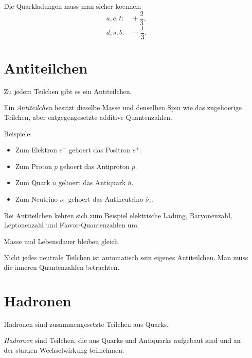 \begin{examtipbox}
Die Quarkladungen muss man sicher koennen:
\[
    u,c,t:\quad +\frac{2}{3},
\]
\[
    d,s,b:\quad -\frac{1}{3}.
\]
\end{examtipbox}

\section{Antiteilchen}

Zu jedem Teilchen gibt es ein Antiteilchen.

\begin{definitionbox}
Ein \emph{Antiteilchen} besitzt dieselbe Masse und denselben Spin wie das zugehoerige
Teilchen, aber entgegengesetzte additive Quantenzahlen.
\end{definitionbox}

\begin{conceptbox}
Beispiele:
\begin{itemize}
    \item Zum Elektron $e^-$ gehoert das Positron $e^+$.
    \item Zum Proton $p$ gehoert das Antiproton $\overline{p}$.
    \item Zum Quark $u$ gehoert das Antiquark $\overline{u}$.
    \item Zum Neutrino $\nu_e$ gehoert das Antineutrino $\overline{\nu}_e$.
\end{itemize}
\end{conceptbox}

\begin{notebox}
Bei Antiteilchen kehren sich zum Beispiel elektrische Ladung, Baryonenzahl,
Leptonenzahl und Flavor-Quantenzahlen um.

Masse und Lebensdauer bleiben gleich.
\end{notebox}

\begin{examtipbox}
Nicht jedes neutrale Teilchen ist automatisch sein eigenes Antiteilchen.
Man muss die inneren Quantenzahlen betrachten.
\end{examtipbox}

\section{Hadronen}

Hadronen sind zusammengesetzte Teilchen aus Quarks.

\begin{definitionbox}
\emph{Hadronen} sind Teilchen, die aus Quarks und Antiquarks aufgebaut sind und an
der starken Wechselwirkung teilnehmen.
\end{definitionbox}

